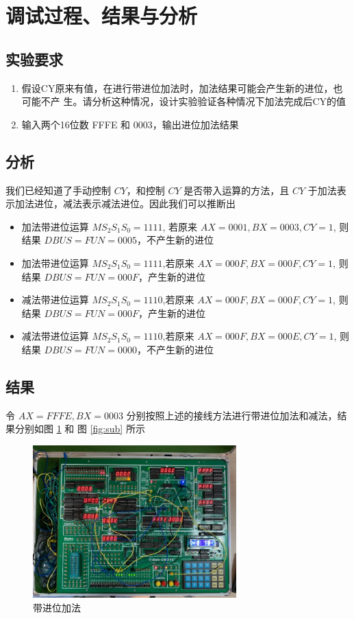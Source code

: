 \documentclass[a4paper,10pt,UTF8]{paper}
\numberwithin{equation}{section}
\numberwithin{figure}{section}
\begin{document}
\section{调试过程、结果与分析}

\subsection{实验要求}

\begin{enumerate}
  \item 假设CY原来有值，在进行带进位加法时，加法结果可能会产生新的进位，也可能不产 生。请分析这种情况，设计实验验证各种情况下加法完成后CY的值
  \item 输入两个16位数 FFFE 和 0003，输出进位加法结果
\end{enumerate}




\subsection{分析}

我们已经知道了手动控制 $CY$，和控制 $CY$ 是否带入运算的方法，且 $CY$ 于加法表示加法进位，减法表示减法进位。因此我们可以推断出

\begin{itemize}
  \item 加法带进位运算 $MS_2S_1S_0=1111$, 若原来 $AX=0001,BX=0003,CY=1$, 则结果 $DBUS=FUN=0005$，不产生新的进位
  \item 加法带进位运算 $MS_2S_1S_0=1111$,若原来 $AX=000F,BX=000F,CY=1$, 则结果 $DBUS=FUN=000F$，产生新的进位
  \item 减法带进位运算 $MS_2S_1S_0=1110$,若原来 $AX=000F,BX=000F,CY=1$, 则结果 $DBUS=FUN=000F$，产生新的进位
  \item 减法带进位运算 $MS_2S_1S_0=1110$,若原来 $AX=000F,BX=000E,CY=1$, 则结果 $DBUS=FUN=0000$，不产生新的进位
\end{itemize}

\subsection{结果}

令 $AX=FFFE, BX=0003$ 分别按照上述的接线方法进行带进位加法和减法，结果分别如图 \ref{fig:add} 和 图 \ref{fig:sub} 所示

\begin{figure}[h]
  \centering
  \includegraphics[width=0.7\textwidth]{add.jpg}
  \caption{带进位加法}
  \label{fig:add}
\end{figure}
\end{document}
